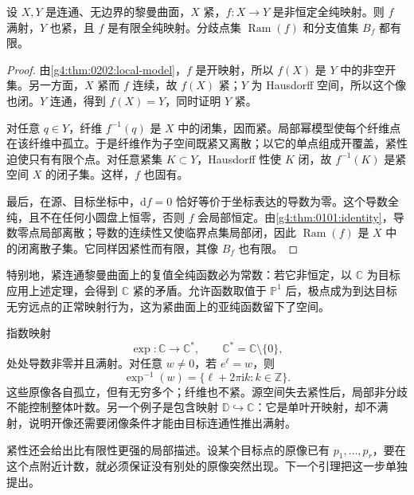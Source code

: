 \begin{theorem}\label{g4:thm:0202:finite-map}
	设 \(X,Y\) 是连通、无边界的黎曼曲面，\(X\) 紧，\(f:X\rightarrow Y\) 是非恒定全纯映射。则 \(f\) 满射，\(Y\) 也紧，且 \(f\) 是有限全纯映射。分歧点集 \(\operatorname{Ram}(f)\) 和分支值集 \(B_f\) 都有限。
\end{theorem}
\begin{proof}
	由\cref{g4:thm:0202:local-model}，\(f\) 是开映射，所以 \(f(X)\) 是 \(Y\) 中的非空开集。另一方面，\(X\) 紧而 \(f\) 连续，故 \(f(X)\) 紧；\(Y\) 为 Hausdorff 空间，所以这个像也闭。\(Y\) 连通，得到 \(f(X)=Y\)，同时证明 \(Y\) 紧。

	对任意 \(q\in Y\)，纤维 \(f^{-1}(q)\) 是 \(X\) 中的闭集，因而紧。局部幂模型使每个纤维点在该纤维中孤立。于是纤维作为子空间既紧又离散；以它的单点组成开覆盖，紧性迫使只有有限个点。对任意紧集 \(K\subset Y\)，Hausdorff 性使 \(K\) 闭，故 \(f^{-1}(K)\) 是紧空间 \(X\) 的闭子集。这样，\(f\) 也固有。

	最后，在源、目标坐标中，\(\mathrm{d}f=0\) 恰好等价于坐标表达的导数为零。这个导数全纯，且不在任何小圆盘上恒零，否则 \(f\) 会局部恒定。由\cref{g4:thm:0101:identity}，导数零点局部离散；导数的连续性又使临界点集局部闭，因此 \(\operatorname{Ram}(f)\) 是 \(X\) 中的闭离散子集。它同样因紧性而有限，其像 \(B_f\) 也有限。
\end{proof}

特别地，紧连通黎曼曲面上的复值全纯函数必为常数：若它非恒定，以 \(\mathbb C\) 为目标应用上述定理，会得到 \(\mathbb C\) 紧的矛盾。允许函数取值于 \(\mathbb P^1\) 后，极点成为到达目标无穷远点的正常映射行为，这为紧曲面上的亚纯函数留下了空间。

\begin{example}\label{g4:exm:0202:noncompact-fibers}
	指数映射
	\[
		\exp:\mathbb C\longrightarrow\mathbb C^*,\qquad
		\mathbb C^*=\mathbb C\setminus\{0\},
	\]
	处处导数非零并且满射。对任意 \(w\neq0\)，若 \(e^\ell=w\)，则
	\[
		\exp^{-1}(w)=\{\ell+2\pi\mathrm{i}k:k\in\mathbb Z\}.
	\]
	这些原像各自孤立，但有无穷多个；纤维也不紧。源空间失去紧性后，局部非分歧不能控制整体叶数。另一个例子是包含映射 \(\mathbb D\hookrightarrow\mathbb C\)：它是单叶开映射，却不满射，说明开像还需要闭像条件才能由目标连通性推出满射。
\end{example}

紧性还会给出比有限性更强的局部描述。设某个目标点的原像已有 \(p_1,\ldots,p_r\)，要在这个点附近计数，就必须保证没有别处的原像突然出现。下一个引理把这一步单独提出。

